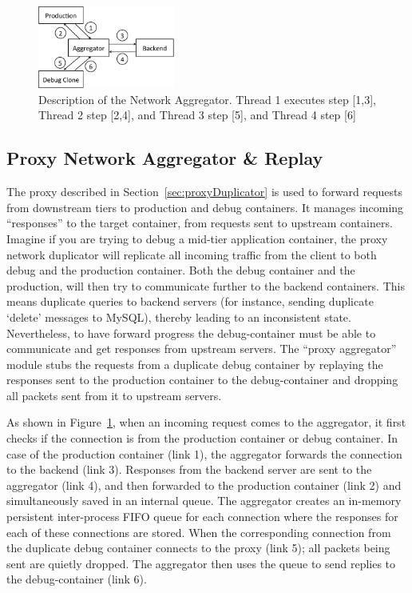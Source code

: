 \begin{figure}[ht!]
	\begin{center}
		\includegraphics[width=0.4\textwidth]{figs/aggregator.pdf}
		\caption{Description of the Network Aggregator. Thread 1 executes step [1,3], Thread 2 step [2,4], and Thread 3 step [5], and Thread 4 step [6]}
		\label{fig:aggregator}
	\end{center}
\end{figure}

\subsection{Proxy Network Aggregator \& Replay }
\label{sec:proxyAggregator}

The proxy described in Section~\ref{sec:proxyDuplicator} is used to forward requests from downstream tiers to production and debug containers.
It manages incoming ``responses'' to the target container, from requests sent to upstream containers.
Imagine if you are trying to debug a mid-tier application container, the proxy network duplicator will replicate all incoming traffic from the client to both debug and the production container. 
Both the debug container and the production, will then try to communicate further to the backend containers.
This means duplicate queries to backend servers (for instance, sending duplicate `delete' messages to MySQL), thereby leading to an inconsistent state.
Nevertheless, to have forward progress the debug-container must be able to communicate and get responses from upstream servers.
The ``proxy aggregator'' module stubs the requests from a duplicate debug container by replaying the responses sent to the production container to the debug-container and dropping all packets sent from it to upstream servers.

As shown in  Figure~\ref{fig:aggregator}, when an incoming request comes to the aggregator, it first checks if the connection is from the production container or debug container. 
In case of the production container (link 1), the aggregator forwards the connection to the backend (link 3). 
Responses from the backend server are sent to the aggregator (link 4), and then forwarded to the production container (link 2) and simultaneously saved in an internal queue.
The aggregator creates an in-memory persistent inter-process FIFO queue for each connection where the responses for each of these connections are stored.
When the corresponding connection from the duplicate debug container connects to the proxy (link 5); all packets being sent are quietly dropped. 
The aggregator then uses the queue to send replies to the debug-container (link 6).

